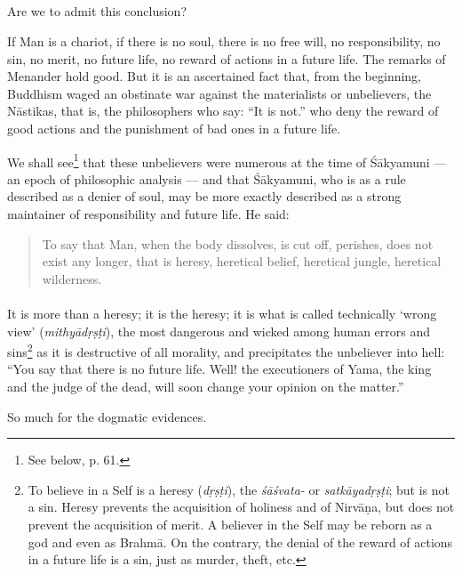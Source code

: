 \documentclass[a4paper, 11pt, oneside, english]{article}
\begin{document}
\subsection{}
\paragraph{}
Are we to admit this conclusion?

If Man is a chariot, if there is no soul, there is no free will, no responsibility, no sin, no merit, no future life, no reward of actions in a future life. The remarks of Menander hold good. But it is an ascertained fact that, from the beginning, Buddhism waged an obstinate war against the materialists or unbelievers, the Nāstikas, that is, the philosophers who say: ``It is not.'' who deny the reward of good actions and the punishment of bad ones in a future life.

We shall see\footnote{See below, p. 61.} that these unbelievers were numerous at the time of Śākyamuni --- an epoch of philosophic analysis --- and that Śākyamuni, who is as a rule described as a denier of soul, may be more exactly described as a strong maintainer of responsibility and future life. He said:
\begin{quotation}
\small
To say that Man, when the body dissolves, is cut off, perishes, does not exist any longer, that is heresy, heretical belief, heretical jungle, heretical wilderness.
\end{quotation}
\paragraph{}
It is more than a heresy; it is the heresy; it is what is called technically `wrong view' (\emph{mithyādṛṣṭi}), the most dangerous and wicked among human errors and sins\footnote{To believe in a Self is a heresy (\emph{dṛṣṭi}), the \emph{śāśvata-} or \emph{satkāyadṛṣṭi}; but is not a sin. Heresy prevents the acquisition of holiness and of Nirvāṇa, but does not prevent the acquisition of merit. A believer in the Self may be reborn as a god and even as Brahmā. On the contrary, the denial of the reward of actions in a future life is a sin, just as murder, theft, etc.} as it is destructive of all morality, and precipitates the unbeliever into hell: ``You say that there is no future life. Well! the executioners of Yama, the king and the judge of the dead, will soon change your opinion on the matter.''

So much for the dogmatic evidences.
\end{document}
